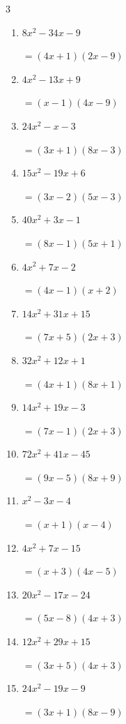 \begin{multicols}{3}
\begin{enumerate}
        $=(5x-1)(7x-1)$

  \item $8x^{2}-34x-9$

        $=(4x+1)(2x-9)$

  \item $4x^{2}-13x+9$

        $=(x-1)(4x-9)$

  \item $24x^{2}-x-3$

        $=(3x+1)(8x-3)$

  \item $15x^{2}-19x+6$

        $=(3x-2)(5x-3)$

  \item $40x^{2}+3x-1$

        $=(8x-1)(5x+1)$

\columnbreak %

  \item $4x^{2}+7x-2$

        $=(4x-1)(x+2)$

  \item $14x^{2}+31x+15$

        $=(7x+5)(2x+3)$

  \item $32x^{2}+12x+1$

        $=(4x+1)(8x+1)$

  \item $14x^{2}+19x-3$

        $=(7x-1)(2x+3)$

  \item $72x^{2}+41x-45$

        $=(9x-5)(8x+9)$

  \item $x^{2}-3x-4$

        $=(x+1)(x-4)$

  \item $4x^{2}+7x-15$

        $=(x+3)(4x-5)$

  \item $20x^{2}-17x-24$

        $=(5x-8)(4x+3)$

  \item $12x^{2}+29x+15$

        $=(3x+5)(4x+3)$

  \item $24x^{2}-19x-9$

        $=(3x+1)(8x-9)$


\end{enumerate}
\end{multicols}
